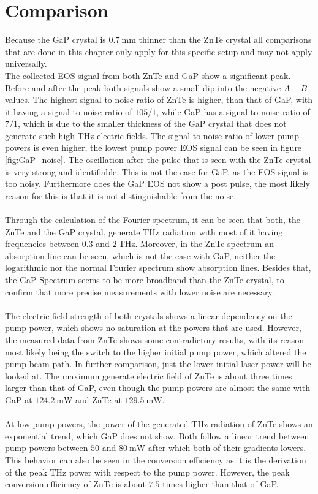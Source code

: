 \section{Comparison}
Because the GaP crystal is $\SI{0.7}{\milli\meter}$ thinner than the ZnTe crystal all comparisons that are done in this chapter only apply for this specific setup and may not apply universally.
\\
The collected EOS signal from both ZnTe and GaP show a significant peak.
Before and after the peak both signals show a small dip into the negative $A-B$ values.
The highest signal-to-noise ratio of ZnTe is higher, than that of GaP, with it having a signal-to-noise ratio of $105/1$, while GaP has a signal-to-noise ratio of $7/1$, which is due to the smaller thickness of the GaP crystal that does not generate such high $\si{\tera\hertz}$ electric fields.
The signal-to-noise ratio of lower pump powers is even higher, the lowest pump power EOS signal can be seen in figure \ref{fig:GaP_noise}.
The oscillation after the pulse that is seen with the ZnTe crystal is very strong and identifiable.
This is not the case for GaP, as the EOS signal is too noisy.
Furthermore does the GaP EOS not show a post pulse, the most likely reason for this is that it is not distinguishable from the noise.
\\\\
Through the calculation of the Fourier spectrum, it can be seen that both, the ZnTe and the GaP crystal, generate $\si{\tera\hertz}$ radiation with most of it having frequencies between $0.3$ and $\SI{2}{\tera\hertz}$.
Moreover, in the ZnTe spectrum an absorption line can be seen, which is not the case with GaP, neither the logarithmic nor the normal Fourier spectrum show absorption lines.
Besides that, the GaP Spectrum seems to be more broadband than the ZnTe crystal, to confirm that more precise measurements with lower noise are necessary.
\\\\
The electric field strength of both crystals shows a linear dependency on the pump power, which shows no saturation at the powers that are used.
However, the measured data from ZnTe shows some contradictory results, with its reason most likely being the switch to the higher initial pump power, which altered the pump beam path.
In further comparison, just the lower initial laser power will be looked at.
The maximum generate electric field of ZnTe is about three times larger than that of GaP, even though the pump powers are almost the same with GaP at $\SI{124.2}{\milli\W}$ and ZnTe at $\SI{129.5}{\milli\W}$.
\\\\
At low pump powers, the power of the generated $\si{\tera\hertz}$ radiation of ZnTe shows an exponential trend, which GaP does not show.
Both follow a linear trend between pump powers between $50$ and $\SI{80}{\milli\W}$ after which both of their gradients lowers.
This behavior can also be seen in the conversion efficiency as it is the derivation of the peak $\si{\tera\hertz}$ power with respect to the pump power.
However, the peak conversion efficiency of ZnTe is about $7.5$ times higher than that of GaP. 